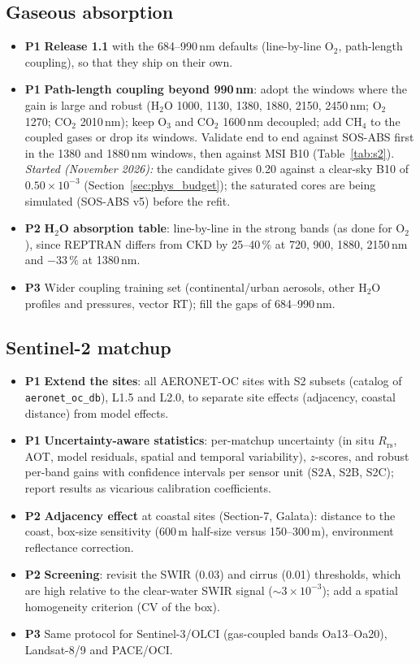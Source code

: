 \documentclass[11pt,a4paper]{article}
\newcommand{\Rrs}{R_\mathrm{rs}}
\newcommand{\code}[1]{\texttt{#1}}
\newcommand{\prio}[1]{\textbf{\textcolor{blue!50!black}{#1}}}
\begin{document}
\subsection{Gaseous absorption}
\begin{itemize}
\item \prio{P1} \textbf{Release 1.1} with the 684--990\,nm defaults (line-by-line O$_2$, path-length coupling),
  so that they ship on their own.
\item \prio{P1} \textbf{Path-length coupling beyond 990\,nm}: adopt the windows where the gain is large and robust
  (H$_2$O 1000, 1130, 1380, 1880, 2150, 2450\,nm; O$_2$ 1270; CO$_2$ 2010\,nm); keep O$_3$ and CO$_2$ 1600\,nm
  decoupled; add CH$_4$ to the coupled gases or drop its windows. Validate end to end against SOS-ABS first in the
  1380 and 1880\,nm windows, then against MSI B10 (Table~\ref{tab:s2}). \textit{Started (November 2026):} the
  candidate gives 0.20 against a clear-sky B10 of $0.50\times10^{-3}$ (Section~\ref{sec:phys_budget}); the saturated
  cores are being simulated (SOS-ABS v5) before the refit.
\item \prio{P2} \textbf{H$_2$O absorption table}: line-by-line in the strong bands (as done for O$_2$), since REPTRAN
  differs from CKD by 25--40\,\% at 720, 900, 1880, 2150\,nm and $-33\,\%$ at 1380\,nm.
\item \prio{P3} Wider coupling training set (continental/urban aerosols, other H$_2$O profiles and pressures,
  vector RT); fill the gaps of 684--990\,nm.
\end{itemize}

\subsection{Sentinel-2 matchup}
\begin{itemize}
\item \prio{P1} \textbf{Extend the sites}: all AERONET-OC sites with S2 subsets (catalog of
  \code{aeronet\_oc\_db}), L1.5 and L2.0, to separate site effects (adjacency, coastal distance) from model effects.
\item \prio{P1} \textbf{Uncertainty-aware statistics}: per-matchup uncertainty (in situ $\Rrs$, AOT, model
  residuals, spatial and temporal variability), $z$-scores, and robust per-band gains with confidence intervals
  per sensor unit (S2A, S2B, S2C); report results as vicarious calibration coefficients.
\item \prio{P2} \textbf{Adjacency effect} at coastal sites (Section-7, Galata): distance to the coast, box-size
  sensitivity (600\,m half-size versus 150--300\,m), environment reflectance correction.
\item \prio{P2} \textbf{Screening}: revisit the SWIR (0.03) and cirrus (0.01) thresholds, which are high relative to
  the clear-water SWIR signal ($\sim3\times10^{-3}$); add a spatial homogeneity criterion (CV of the box).
\item \prio{P3} Same protocol for Sentinel-3/OLCI (gas-coupled bands Oa13--Oa20), Landsat-8/9 and PACE/OCI.
\end{itemize}
\end{document}
